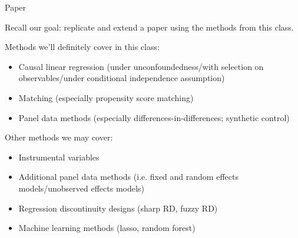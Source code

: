 \documentclass[compress, 8pt]{beamer}
\begin{document}
\begin{frame}{Paper}

Recall our goal: replicate and extend a paper using the methods from this class.

\vspace{3ex}
Methods we'll definitely cover in this class:
\begin{itemize}
    \item Causal linear regression (under unconfoundedness/with selection on observables/under conditional independence assumption)
    \item Matching (especially propensity score matching)
    \item Panel data methods (especially differences-in-differences; synthetic control)
\end{itemize}

\vspace{3ex}
Other methods we may cover:
\begin{itemize}
    \item Instrumental variables
    \item Additional panel data methods (i.e. fixed and random effects models/unobserved effects models)
    \item Regression discontinuity designs (sharp RD, fuzzy RD)
    \item Machine learning methods (lasso, random forest)
\end{itemize}


\end{frame}
\end{document}
